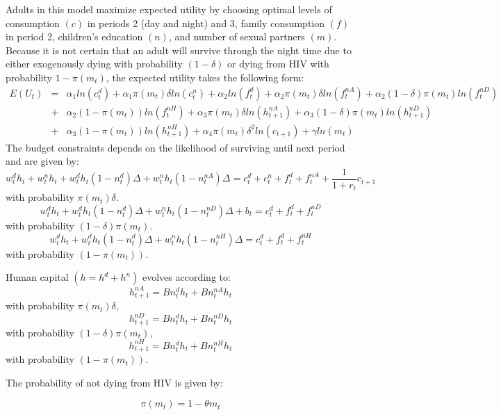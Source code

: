 \documentclass[12pt]{article}
\newcommand{\beq}{\begin{equation}}
\newcommand{\eeq}{\end{equation}}
\begin{document}
Adults in this model maximize expected utility by choosing optimal levels of consumption $(c)$ in periods 2 (day and night) and 3, family consumption $(f)$ in period 2, children's education $(n)$, and number of sexual partners $(m)$. Because it is not certain that an adult will survive through the night time due to either exogenously dying with probability $(1-\delta)$ or dying from HIV with probability $1-\pi(m_t)$, the expected utility takes the following form:
\begin{eqnarray} E(U_t) &=& \alpha_1 ln(c_t^d) + \alpha_1 \pi(m_t)\delta ln(c_t^n) + \alpha_2 ln(f_t^d) + \alpha_2 \pi(m_t)\delta ln(f_t^{nA}) +  \alpha_2 (1-\delta)\pi(m_t)ln(f_t^{nD}) \nonumber \\
&+& \alpha_2 (1-\pi(m_t))ln(f_t^{nH}) + \alpha_3 \pi(m_t)\delta ln(h_{t+1}^{nA}) + \alpha_3 (1-\delta)\pi(m_t)ln(h_{t+1}^{nD}) \\
&+& \alpha_3 (1-\pi(m_t))ln(h_{t+1}^{nH}) + \alpha_4 \pi(m_t)\delta^2 ln(c_{t+1}) + \gamma ln(m_t) \nonumber
\end{eqnarray}
The budget constraints depends on the likelihood of surviving until next period and are given by:
\beq w_t^dh_t + w_t^nh_t + w_t^dh_t(1-n_t^d)\Delta + w_t^nh_t(1-n_t^{nA})\Delta = c_t^d + c_t^n + f_t^d + f_t^{nA} + \frac{1}{1+r_t}c_{t+1} \eeq
with probability $\pi(m_t)\delta$.
\beq w_t^dh_t + w_t^dh_t(1-n_t^d)\Delta + w_t^nh_t(1-n_t^{nD})\Delta + b_t = c_t^d + f_t^d + f_t^{nD} \eeq
with probability $(1-\delta)\pi(m_t)$.
\beq w_t^dh_t + w_t^dh_t(1-n_t^d)\Delta + w_t^nh_t(1-n_t^{nH})\Delta = c_t^d + f_t^d + f_t^{nH} \eeq
with probability $(1-\pi(m_t))$.

Human capital $(h = h^d + h^n)$ evolves according to:
\beq h_{t+1}^{nA} = Bn_t^dh_t + Bn_t^{nA}h_t \eeq
with probability $\pi(m_t)\delta$,
\beq h_{t+1}^{nD} = Bn_t^dh_t + Bn_t^{nD}h_t \eeq
with probability $(1-\delta)\pi(m_t)$,
\beq h_{t+1}^{nH} = Bn_t^dh_t + Bn_t^{nH}h_t \eeq
with probability $(1-\pi(m_t))$.

The probability of not dying from HIV is given by:

\beq \pi(m_t) = 1-\theta m_t \eeq
\end{document}
